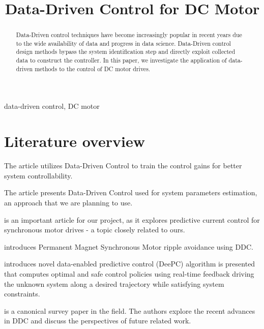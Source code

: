 \documentclass[conference]{IEEEtran}
\begin{document}
\title{Data-Driven Control for DC Motor
}

\author{
\and
{}
\and
{}
}

\maketitle

\begin{abstract}
Data-Driven control techniques have become increasingly popular in recent years due to the wide availability of data and progress in data science.
Data-Driven control design methods bypass the system identification
step and directly exploit collected data to construct the controller.
In this paper, we investigate the application of data-driven
methods to the control of DC motor drives.
\end{abstract}

\begin{IEEEkeywords}
data-driven control, DC motor
\end{IEEEkeywords}

\section{Literature overview}

The article \cite{silva2019a} utilizes Data-Driven Control to train the control gains for better system controllability.

The article \cite{naung2018a} presents Data-Driven Control used for system parameters estimation, an approach that we are planning to use.

\cite{carlet2020data} is an important article for our project, as it explores predictive current control for
synchronous motor drives - a topic closely related to ours. 

\cite{hanke2019continuous} introduces Permanent Magnet Synchronous Motor ripple avoidance using DDC.

\cite{coulson2019data} introduces novel data-enabled predictive
control (DeePC) algorithm is presented that computes optimal
and safe control policies using real-time feedback driving the
unknown system along a desired trajectory while satisfying
system constraints.

\cite{hou2013model} is a canonical survey paper in the field. The authors explore the recent advances in DDC and discuss the perspectives of future related work.
\end{document}

